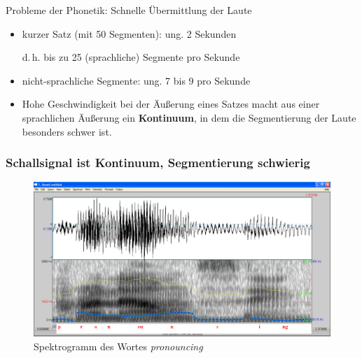 \begin{frame}{Probleme der Phonetik: Schnelle Übermittlung der Laute}

		\begin{itemize}
			\item kurzer Satz (mit 50 Segmenten): ung. 2 Sekunden\par
				d.\,h. bis zu 25 (sprachliche) Segmente pro Sekunde
			\item nicht-sprachliche Segmente: ung. 7 bis 9 pro Sekunde
			\item[\ra] Hohe Geschwindigkeit bei der Äußerung eines Satzes macht aus einer sprachlichen Äußerung ein \textbf{Kontinuum}, in dem die Segmentierung der Laute besonders schwer ist.
		\end{itemize}
		
	
\end{frame}


\begin{frame}
\frametitle{Schallsignal ist Kontinuum, Segmentierung schwierig}

	\begin{figure}[H]
	\centering
	
	\includegraphics[scale=0.2]{material/04Pronouncing}
	\caption{Spektrogramm des Wortes \emph{pronouncing}}
	\end{figure}	
	
\end{frame}



